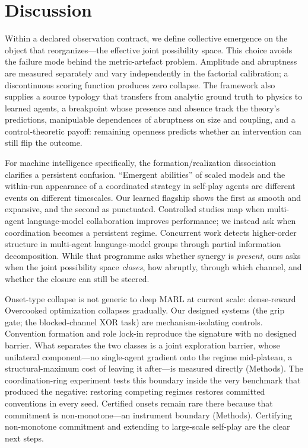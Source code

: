 \documentclass[11pt]{article}
\begin{document}
\section*{Discussion}

Within a declared observation contract, we define collective
emergence on the
object that reorganizes---the effective joint possibility space. This
choice avoids the failure mode behind the metric-artefact
problem\citep{schaeffer2023emergent}. Amplitude and abruptness are
measured separately and vary independently in the factorial
calibration; a discontinuous scoring function produces zero collapse.
The framework also supplies a source typology that transfers from analytic ground truth
to physics to learned agents, a breakpoint whose presence and absence
track the theory's predictions, manipulable dependences of abruptness
on size and coupling, and a control-theoretic payoff: remaining
openness predicts whether an intervention can still flip the outcome.

For machine intelligence specifically, the formation/realization
dissociation clarifies a persistent confusion. ``Emergent abilities'' of
scaled models\citep{wei2022emergent} and the within-run appearance of a
coordinated strategy in self-play
agents\citep{baker2020emergent,vinyals2019grandmaster,bard2020hanabi}
are different events on different timescales. Our learned flagship
shows the first as smooth and expansive, and the second as punctuated.
Controlled studies map when multi-agent language-model collaboration
improves performance\citep{kim2026capable}; we instead ask when
coordination becomes a persistent regime.
Concurrent work detects higher-order structure in multi-agent
language-model groups through partial information
decomposition\citep{riedl2026emergent}. While that programme asks
whether synergy is \emph{present}, ours asks when the joint possibility
space \emph{closes}, how abruptly, through which channel, and whether
the closure can still be steered.

Onset-type
collapse is not generic to deep MARL at current scale: dense-reward
Overcooked optimization collapses gradually. Our designed systems (the
grip gate; the blocked-channel XOR task) are mechanism-isolating
controls. Convention formation and role
lock-in reproduce the signature with no designed barrier. What
separates the two classes is a joint exploration barrier, whose
unilateral component---no single-agent gradient onto the regime
mid-plateau, a structural-maximum cost of leaving it after---is
measured directly (Methods). The
coordination-ring experiment tests this boundary inside the very
benchmark that produced the negative: restoring competing regimes
restores committed conventions in every seed. Certified onsets remain
rare there because that commitment is non-monotone---an instrument
boundary (Methods). Certifying non-monotone commitment and extending to
large-scale self-play are the clear next steps.
\end{document}
